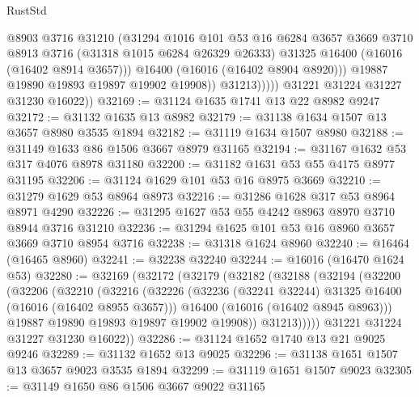 \begin{lexlean}{RustStd}
\begin{coremodule}
                        @8903
                        @3716
                        @31210
                        (@31294
                          @1016
                          @101
                          @53
                          @16
                          @6284
                          @3657
                          @3669
                          @3710
                          @8913
                          @3716
                          (@31318 @1015 @6284 @26329 @26333)
                          @31325
                          @16400
                          (@16016 (@16402 @8914 @3657)))
                        @16400
                        (@16016 (@16402 @8904 @8920)))
                      @19887
                      @19890
                      @19893
                      @19897
                      @19902
                      @19908))
                  @31213)))))
        @31221
        @31224
        @31227
        @31230
        @16022))
@32169 := @31124 @1635 @1741 @13 @22 @8982 @9247
@32172 := @31132 @1635 @13 @8982
@32179 := @31138 @1634 @1507 @13 @3657 @8980 @3535 @1894
@32182 := @31119 @1634 @1507 @8980
@32188 := @31149 @1633 @86 @1506 @3667 @8979 @31165
@32194 := @31167 @1632 @53 @317 @4076 @8978 @31180
@32200 := @31182 @1631 @53 @55 @4175 @8977 @31195
@32206 := @31124 @1629 @101 @53 @16 @8975 @3669
@32210 := @31279 @1629 @53 @8964 @8973
@32216 := @31286 @1628 @317 @53 @8964 @8971 @4290
@32226 := @31295 @1627 @53 @55 @4242 @8963 @8970 @3710 @8944 @3716 @31210
@32236 := @31294 @1625 @101 @53 @16 @8960 @3657 @3669 @3710 @8954 @3716
@32238 := @31318 @1624 @8960
@32240 := @16464 (@16465 @8960)
@32241 := @32238 @32240
@32244 := @16016 (@16470 @1624 @53)
@32280 := @32169
    (@32172
      (@32179
        (@32182
          (@32188
            (@32194
              (@32200
                (@32206
                  (@32210
                    (@32216
                      (@32226
                        (@32236 (@32241 @32244) @31325 @16400 (@16016 (@16402 @8955 @3657)))
                        @16400
                        (@16016 (@16402 @8945 @8963)))
                      @19887
                      @19890
                      @19893
                      @19897
                      @19902
                      @19908))
                  @31213)))))
        @31221
        @31224
        @31227
        @31230
        @16022))
@32286 := @31124 @1652 @1740 @13 @21 @9025 @9246
@32289 := @31132 @1652 @13 @9025
@32296 := @31138 @1651 @1507 @13 @3657 @9023 @3535 @1894
@32299 := @31119 @1651 @1507 @9023
@32305 := @31149 @1650 @86 @1506 @3667 @9022 @31165

\end{coremodule}
\end{lexlean}
